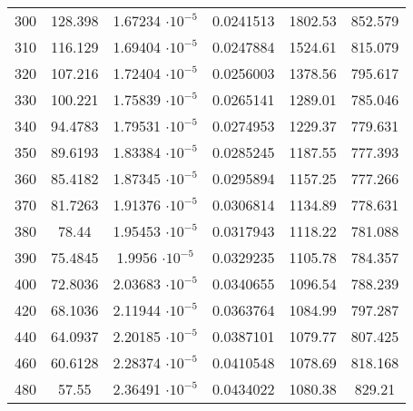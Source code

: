\begin{table}
\begin{center}
\begin{tabular}{cccccc}
300	&	128.398	&	1.67234 $ \cdot 10^{-5}$	&	0.0241513	&	1802.53	&	852.579	\\
310	&	116.129	&	1.69404 $ \cdot 10^{-5}$	&	0.0247884	&	1524.61	&	815.079	\\
320	&	107.216	&	1.72404 $ \cdot 10^{-5}$	&	0.0256003	&	1378.56	&	795.617	\\
330	&	100.221	&	1.75839 $ \cdot 10^{-5}$	&	0.0265141	&	1289.01	&	785.046	\\
340	&	94.4783	&	1.79531 $ \cdot 10^{-5}$	&	0.0274953	&	1229.37	&	779.631	\\
350	&	89.6193	&	1.83384 $ \cdot 10^{-5}$	&	0.0285245	&	1187.55	&	777.393	\\
360	&	85.4182	&	1.87345 $ \cdot 10^{-5}$	&	0.0295894	&	1157.25	&	777.266	\\
370	&	81.7263	&	1.91376 $ \cdot 10^{-5}$	&	0.0306814	&	1134.89	&	778.631	\\
380	&	78.44	&	1.95453 $ \cdot 10^{-5}$	&	0.0317943	&	1118.22	&	781.088	\\
390	&	75.4845	&	1.9956 $ \cdot 10^{-5}$	&	0.0329235	&	1105.78	&	784.357	\\
400	&	72.8036	&	2.03683 $ \cdot 10^{-5}$	&	0.0340655	&	1096.54	&	788.239	\\
420	&	68.1036	&	2.11944 $ \cdot 10^{-5}$	&	0.0363764	&	1084.99	&	797.287	\\
440	&	64.0937	&	2.20185 $ \cdot 10^{-5}$	&	0.0387101	&	1079.77	&	807.425	\\
460	&	60.6128	&	2.28374 $ \cdot 10^{-5}$	&	0.0410548	&	1078.69	&	818.168	\\
480	&	57.55	&	2.36491 $ \cdot 10^{-5}$	&	0.0434022	&	1080.38	&	829.21	\\
\bottomrule
\end{tabular}
\end{center}
\end{table}

